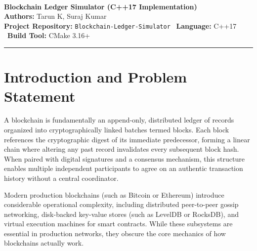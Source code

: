 \documentclass[11pt,a4paper]{report}
\begin{document}
\\[0.6em]
{\LARGE \textbf{Blockchain Ledger Simulator (C++17 Implementation)}}\\[1em]
\noindent\textbf{Authors:} Tarun K, Suraj Kumar\\[0.5em]
\noindent\textbf{Project Repository:} \texttt{Blockchain-Ledger-Simulator} \textbar\ \textbf{Language:} C++17 \textbar\ \textbf{Build Tool:} CMake 3.16+

\vspace{0.8em}
\hrule
\vspace{1.2em}

\section{Introduction and Problem Statement}

A blockchain is fundamentally an append-only, distributed ledger of records organized into cryptographically linked batches termed blocks. Each block references the cryptographic digest of its immediate predecessor, forming a linear chain where altering any past record invalidates every subsequent block hash. When paired with digital signatures and a consensus mechanism, this structure enables multiple independent participants to agree on an authentic transaction history without a central coordinator.

Modern production blockchains (such as Bitcoin or Ethereum) introduce considerable operational complexity, including distributed peer-to-peer gossip networking, disk-backed key-value stores (such as LevelDB or RocksDB), and virtual execution machines for smart contracts. While these subsystems are essential in production networks, they obscure the core mechanics of how blockchains actually work.
\end{document}
